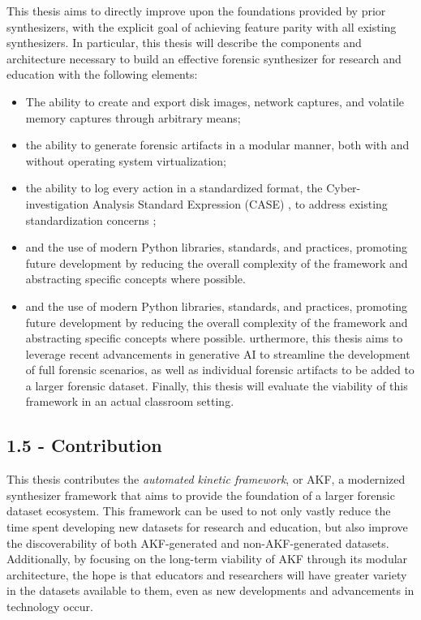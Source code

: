 This thesis aims to directly improve upon the foundations provided by
prior synthesizers, with the explicit goal of achieving feature parity
with all existing synthesizers. In particular, this thesis will describe
the components and architecture necessary to build an effective forensic
synthesizer for research and education with the following elements:

\begin{itemize}
\item
  The ability to create and export disk images, network captures, and
  volatile memory captures through arbitrary means;
\item
  the ability to generate forensic artifacts in a modular manner, both
  with and without operating system virtualization;
\item
  the ability to log every action in a standardized format, the
  Cyber-investigation Analysis Standard Expression (CASE)
  \cite{caseyAdvancingCoordinatedCyberinvestigations2017}, to
  address existing standardization concerns
  \cite{horsmanDatasetConstructionChallenges2021};
\item
  and the use of modern Python libraries, standards, and practices,
  promoting future development by reducing the overall complexity of the
  framework and abstracting specific concepts where possible.
\item
  and the use of modern Python libraries, standards, and practices,
  promoting future development by reducing the overall complexity of the
  framework and abstracting specific concepts where possible.
  urthermore, this thesis aims to leverage recent advancements in
  generative AI to streamline the development of full forensic
  scenarios, as well as individual forensic artifacts to be added to a
  larger forensic dataset. Finally, this thesis will evaluate the
  viability of this framework in an actual classroom setting.
\end{itemize}

\subsection{1.5 - Contribution}\label{contribution}

This thesis contributes the \emph{automated kinetic framework}, or AKF,
a modernized synthesizer framework that aims to provide the foundation
of a larger forensic dataset ecosystem. This framework can be used to
not only vastly reduce the time spent developing new datasets for
research and education, but also improve the discoverability of both
AKF-generated and non-AKF-generated datasets. Additionally, by focusing
on the long-term viability of AKF through its modular architecture, the
hope is that educators and researchers will have greater variety in the
datasets available to them, even as new developments and advancements in
technology occur.
